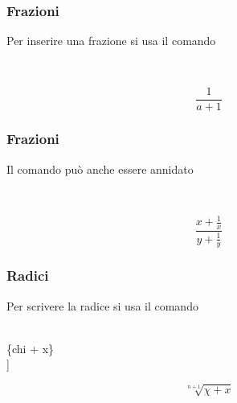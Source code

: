 \begin{frame}
  \frametitle{Frazioni}
	Per inserire una frazione si usa il comando 
	\begin{LaTeXcode}
		\\[\n
    \hspace*{5ex}\alert{\\frac\{1\}\{a+1\}}\n
		\\]
	\end{LaTeXcode}
	\begin{LaTeXoutput}
		\[
			\frac{1}{a+1}
		\]
	\end{LaTeXoutput}
\end{frame}
\begin{frame}
  \frametitle{Frazioni}
	Il comando  pu\`o anche essere annidato
	\begin{LaTeXcode}
		\\[\n
    \alert{\\frac}\{x+\alert{\\frac\{1\}\{x\}}\}\{y+\alert{\\frac\{1\}\{y\}}\}\n
		\\]
	\end{LaTeXcode}
	\begin{LaTeXoutput}
		\[
			\frac{x+\frac{1}{x}}{y+\frac{1}{y}}
		\]
	\end{LaTeXoutput}
\end{frame}
\begin{frame}
  \frametitle{Radici}
	Per scrivere la radice si usa il comando 
 	\begin{LaTeXcode}
		\\[\n
		\hspace*{5ex}\alert{\\sqrt}[n+1]\{\bs chi + x\}\n
		\\]
 	\end{LaTeXcode}
	\begin{LaTeXoutput}
		\[
			\sqrt[n+1]{\chi + x}
		\]
	\end{LaTeXoutput}
\end{frame}
